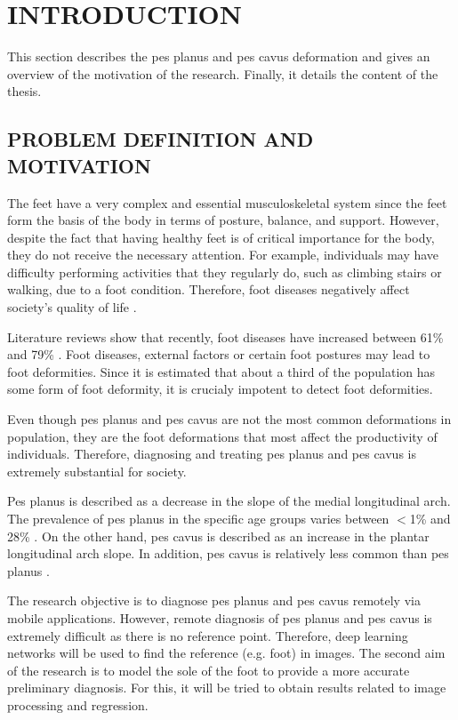 \chapter{INTRODUCTION}\label{chp:Introduction}

This section describes the pes planus and pes cavus deformation and gives an overview of the motivation of the research. Finally, it details the content of the thesis.

\section{PROBLEM DEFINITION AND MOTIVATION}

The feet have a very complex and essential musculoskeletal system since the feet form the basis of the body in terms of posture, balance, and support. However, despite the fact that having healthy feet is of critical importance for the body, they do not receive the necessary attention. For example, individuals may have difficulty performing activities that they regularly do, such as climbing stairs or walking, due to a foot condition. Therefore, foot diseases negatively affect society's quality of life \cite{riskowski2011measures}.

Literature reviews show that recently, foot diseases have increased between 61\% and 79\% \cite{pita2017flat, menz2010characteristics}. Foot diseases, external factors or certain foot postures may lead to foot deformities. Since it is estimated that about a third of the population has some form of foot deformity, it is crucialy impotent to detect foot deformities.

Even though pes planus and pes cavus are not the most common deformations in population, they are the foot deformations that most affect the productivity of individuals. Therefore, diagnosing and treating pes planus and pes cavus is extremely substantial for society.

Pes planus is described as a decrease in the slope of the medial longitudinal arch. The prevalence of pes planus in the specific age groups varies between $<$1\% and 28\% \cite{ccilli2009prevalence, pfeiffer2006prevalence, abdel2006flat, chen2009flatfoot}. On the other hand, pes cavus is described as an increase in the plantar longitudinal arch slope. In addition, pes cavus is relatively less common than pes planus \cite{kharbuja2017prevalence}.

The research objective is to diagnose pes planus and pes cavus remotely via mobile applications. However, remote diagnosis of pes planus and pes cavus is extremely difficult as there is no reference point. Therefore, deep learning networks will be used to find the reference (e.g. foot) in images. The second aim of the research is to model the sole of the foot to provide a more accurate preliminary diagnosis. For this, it will be tried to obtain results related to image processing and regression.


